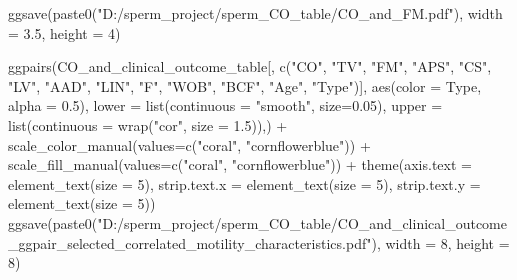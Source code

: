 \documentclass[
  letterpaper,
  DIV=11,
  numbers=noendperiod]{scrreprt}
\newenvironment{Shaded}{\begin{snugshade}}{\end{snugshade}}
\newcommand{\AttributeTok}[1]{\textcolor[rgb]{0.40,0.45,0.13}{#1}}
\newcommand{\DecValTok}[1]{\textcolor[rgb]{0.68,0.00,0.00}{#1}}
\newcommand{\FloatTok}[1]{\textcolor[rgb]{0.68,0.00,0.00}{#1}}
\newcommand{\FunctionTok}[1]{\textcolor[rgb]{0.28,0.35,0.67}{#1}}
\newcommand{\NormalTok}[1]{\textcolor[rgb]{0.00,0.23,0.31}{#1}}
\newcommand{\SpecialCharTok}[1]{\textcolor[rgb]{0.37,0.37,0.37}{#1}}
\newcommand{\StringTok}[1]{\textcolor[rgb]{0.13,0.47,0.30}{#1}}
\begin{document}
\begin{codelisting}
\begin{Shaded}
\begin{Highlighting}[]
\FunctionTok{ggsave}\NormalTok{(}\FunctionTok{paste0}\NormalTok{(}\StringTok{"D:/sperm\_project/sperm\_CO\_table/CO\_and\_FM.pdf"}\NormalTok{), }\AttributeTok{width =} \FloatTok{3.5}\NormalTok{, }\AttributeTok{height =} \DecValTok{4}\NormalTok{)  }


\FunctionTok{ggpairs}\NormalTok{(CO\_and\_clinical\_outcome\_table[, }\FunctionTok{c}\NormalTok{(}\StringTok{"CO"}\NormalTok{, }\StringTok{"TV"}\NormalTok{, }\StringTok{"FM"}\NormalTok{, }\StringTok{"APS"}\NormalTok{, }\StringTok{"CS"}\NormalTok{, }\StringTok{"LV"}\NormalTok{, }\StringTok{"AAD"}\NormalTok{, }\StringTok{"LIN"}\NormalTok{, }\StringTok{"F"}\NormalTok{, }\StringTok{"WOB"}\NormalTok{, }\StringTok{"BCF"}\NormalTok{, }\StringTok{"Age"}\NormalTok{, }\StringTok{"Type"}\NormalTok{)], }\FunctionTok{aes}\NormalTok{(}\AttributeTok{color =}\NormalTok{ Type, }\AttributeTok{alpha =} \FloatTok{0.5}\NormalTok{),}
        \AttributeTok{lower =} \FunctionTok{list}\NormalTok{(}\AttributeTok{continuous =} \StringTok{"smooth"}\NormalTok{, }\AttributeTok{size=}\FloatTok{0.05}\NormalTok{),}
        \AttributeTok{upper =} \FunctionTok{list}\NormalTok{(}\AttributeTok{continuous =} \FunctionTok{wrap}\NormalTok{(}\StringTok{"cor"}\NormalTok{, }\AttributeTok{size =} \FloatTok{1.5}\NormalTok{)),) }\SpecialCharTok{+} 
  \FunctionTok{scale\_color\_manual}\NormalTok{(}\AttributeTok{values=}\FunctionTok{c}\NormalTok{(}\StringTok{"coral"}\NormalTok{, }\StringTok{"cornflowerblue"}\NormalTok{)) }\SpecialCharTok{+} 
  \FunctionTok{scale\_fill\_manual}\NormalTok{(}\AttributeTok{values=}\FunctionTok{c}\NormalTok{(}\StringTok{"coral"}\NormalTok{, }\StringTok{"cornflowerblue"}\NormalTok{)) }\SpecialCharTok{+} 
  \FunctionTok{theme}\NormalTok{(}\AttributeTok{axis.text =} \FunctionTok{element\_text}\NormalTok{(}\AttributeTok{size =} \DecValTok{5}\NormalTok{),}
        \AttributeTok{strip.text.x =} \FunctionTok{element\_text}\NormalTok{(}\AttributeTok{size =} \DecValTok{5}\NormalTok{),}
        \AttributeTok{strip.text.y =} \FunctionTok{element\_text}\NormalTok{(}\AttributeTok{size =} \DecValTok{5}\NormalTok{))}
\FunctionTok{ggsave}\NormalTok{(}\FunctionTok{paste0}\NormalTok{(}\StringTok{"D:/sperm\_project/sperm\_CO\_table/CO\_and\_clinical\_outcome\_ggpair\_selected\_correlated\_motility\_characteristics.pdf"}\NormalTok{), }\AttributeTok{width =} \DecValTok{8}\NormalTok{, }\AttributeTok{height =} \DecValTok{8}\NormalTok{)  }
\end{Highlighting}
\end{Shaded}

\end{codelisting}
\end{document}
